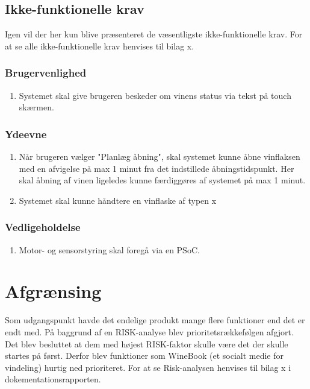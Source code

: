 \documentclass[a4paper, 11pt, oneside]{AuProjectHandin}
\begin{document}
\section{Ikke-funktionelle krav}
Igen vil der her kun blive præsenteret de væsentligste ikke-funktionelle krav. For at se  alle ikke-funktionelle krav henvises til bilag x.
\subsection{Brugervenlighed}

\begin{enumerate}
\item Systemet skal give brugeren beskeder om vinens status via tekst på touch skærmen.
\end{enumerate}

\subsection{Ydeevne}
\begin{enumerate}
\item Når brugeren vælger "Planlæg åbning", skal systemet kunne åbne vinflaksen med en afvigelse på max 1 minut fra det indstillede åbningstidspunkt. 
Her skal åbning af vinen ligeledes kunne færdiggøres af systemet på max 1 minut.
\item Systemet skal kunne håndtere en vinflaske af typen x
\end{enumerate}

\subsection{Vedligeholdelse}
\begin{enumerate}
\item Motor- og sensorstyring skal foregå via en PSoC.
\end{enumerate}

\chapter{Afgrænsing}
Som udgangspunkt havde det endelige produkt mange flere funktioner end det er endt med. På baggrund af en RISK-analyse blev prioritetsrækkefølgen afgjort. 
Det blev besluttet at dem med højest RISK-faktor skulle være det der skulle startes på først. Derfor blev funktioner som WineBook 
(et socialt medie for vindeling) hurtig ned prioriteret. For at se Risk-analysen henvises til bilag x i dokementationsrapporten.
\end{document}
